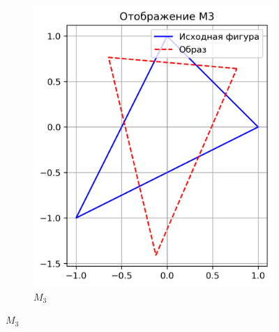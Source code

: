 \begin{figure}[H]
\begin{subfigure}[b]{0.3\textwidth}
    \includegraphics[width=\linewidth]{plots/M3.png}
    \caption{$M_3$}
  \end{subfigure}

  \vspace{0.5cm}


\end{figure}
